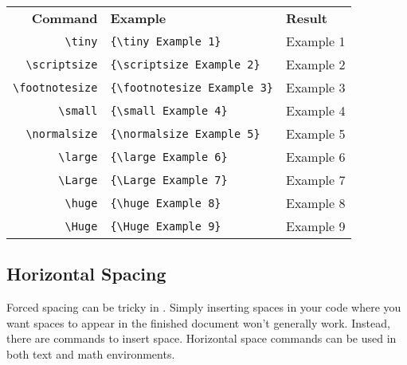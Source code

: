 \documentclass[letterpaper,twoside,10pt]{article}
\begin{document}
\begin{center}
\begin{tabular}{rll}
\small\textbf{Command} & \small\textbf{Example} & \small\textbf{Result}\\
\small\verb!\tiny! & \small\verb!{\tiny Example 1}! & {\tiny Example 1}\\
\small\verb!\scriptsize! & \small\verb!{\scriptsize Example 2}! & {\scriptsize Example 2}\\
\small\verb!\footnotesize! & \small\verb!{\footnotesize Example 3}! & {\footnotesize Example 3}\\
\small\verb!\small! & \small\verb!{\small Example 4}! & {\small Example 4}\\
\small\verb!\normalsize! & \small\verb!{\normalsize Example 5}! & {\normalsize Example 5}\\
\small\verb!\large! & \small\verb!{\large Example 6}! & {\large Example 6}\\
\small\verb!\Large! & \small\verb!{\Large Example 7}! & {\Large Example 7}\\
\small\verb!\huge! & \small\verb!{\huge Example 8}! & {\huge Example 8}\\
\small\verb!\Huge! & \small\verb!{\Huge Example 9}! & {\Huge Example 9}\\
\end{tabular}
\end{center}


\subsection{Horizontal Spacing}

Forced spacing can be tricky in {\LaTeXe}. Simply inserting spaces in your code where you want
spaces to appear in the finished document won't generally work. Instead, there are commands to
insert space. Horizontal space commands can be used in both text and math environments.
\end{document}

